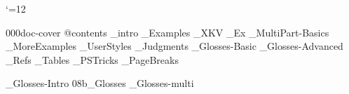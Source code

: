 


 \catcode`\@=12







%





\get 000doc-cover
\get @contents
_intro
_Examples
_XKV
_Ex
_MultiPart-Basics
_MoreExamples
_UserStyles
_Judgments
_Glosses-Basic
_Glosses-Advanced
_Refs
_Tables
_PSTricks
_PageBreaks
 \bye

\bye
_Glosses-Intro
\get 08b_Glosses
_Glosses-multi

